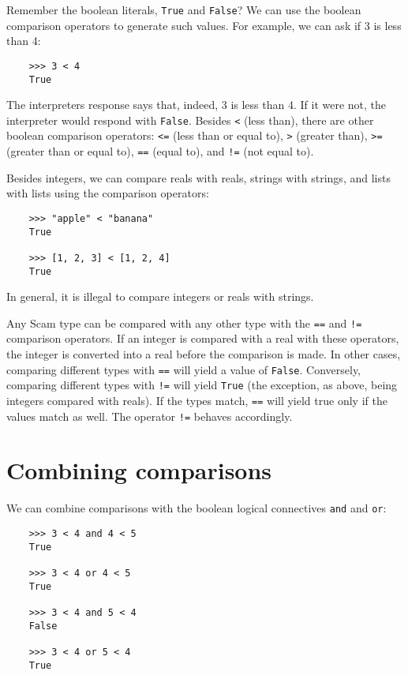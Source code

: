 Remember the {\sc boolean} literals, {\tt True} and {\tt False}?
We can use the {\sc boolean}
comparison operators to generate such values. For example, we can ask
if 3 is less than 4:

\begin{verbatim}
    >>> 3 < 4
    True
\end{verbatim}

The interpreters response says that, indeed, 3 is less than 4. If it were
not, the interpreter would respond with {\tt False}.
Besides
{\tt <}
(less than),
there are other {\sc boolean} comparison operators:
{\tt <=}
(less than or equal to),
{\tt >}
(greater than),
{\tt >=}
(greater than or equal to),
{\tt ==}
(equal to), and
{\tt !=}
(not equal to).

Besides integers, we can compare reals with reals, strings with strings,
and lists with lists
using the comparison operators:

\begin{verbatim}
    >>> "apple" < "banana"
    True
    
    >>> [1, 2, 3] < [1, 2, 4]
    True
\end{verbatim}
    
In general, it is illegal
to compare integers or reals with strings.

Any Scam type can be compared with any other type with the
{\tt ==}
and
{\tt !=}
comparison operators.
If an integer is compared with a real with these
operators, the integer is converted into a real before the comparison
is made. In other cases, comparing different types with
{\tt ==}
will yield
a value of {\tt False}. Conversely, comparing different types with
{\tt !=}
will yield
{\tt True}
(the exception, as above, being integers compared with reals).
If the types match,
{\tt ==}
will yield true only if the values
match as well. The operator
{\tt !=}
behaves accordingly.

\section{Combining comparisons}

We can combine comparisons with the {\sc boolean} logical connectives
{\tt and} and {\tt or}:

\begin{verbatim}
    >>> 3 < 4 and 4 < 5
    True
    
    >>> 3 < 4 or 4 < 5
    True
    
    >>> 3 < 4 and 5 < 4
    False
    
    >>> 3 < 4 or 5 < 4
    True
\end{verbatim}

